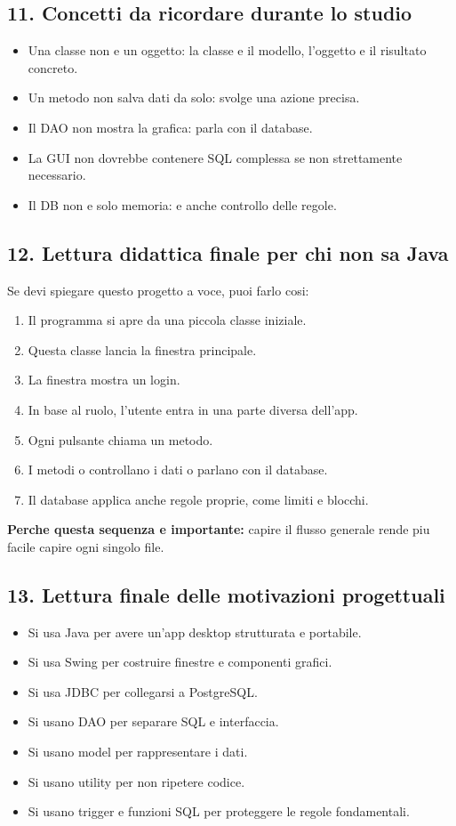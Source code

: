 \documentclass[12pt,a4paper]{article}
\begin{document}
\subsection{11. Concetti da ricordare durante lo studio}
\begin{itemize}
  \item Una classe non e un oggetto: la classe e il modello, l'oggetto e il risultato concreto.
  \item Un metodo non salva dati da solo: svolge una azione precisa.
  \item Il DAO non mostra la grafica: parla con il database.
  \item La GUI non dovrebbe contenere SQL complessa se non strettamente necessario.
  \item Il DB non e solo memoria: e anche controllo delle regole.
\end{itemize}

\subsection{12. Lettura didattica finale per chi non sa Java}
Se devi spiegare questo progetto a voce, puoi farlo cosi:
\begin{enumerate}
  \item Il programma si apre da una piccola classe iniziale.
  \item Questa classe lancia la finestra principale.
  \item La finestra mostra un login.
  \item In base al ruolo, l'utente entra in una parte diversa dell'app.
  \item Ogni pulsante chiama un metodo.
  \item I metodi o controllano i dati o parlano con il database.
  \item Il database applica anche regole proprie, come limiti e blocchi.
\end{enumerate}

\textbf{Perche questa sequenza e importante:} capire il flusso generale rende piu facile capire ogni singolo file.

\subsection{13. Lettura finale delle motivazioni progettuali}
\begin{itemize}
  \item Si usa Java per avere un'app desktop strutturata e portabile.
  \item Si usa Swing per costruire finestre e componenti grafici.
  \item Si usa JDBC per collegarsi a PostgreSQL.
  \item Si usano DAO per separare SQL e interfaccia.
  \item Si usano model per rappresentare i dati.
  \item Si usano utility per non ripetere codice.
  \item Si usano trigger e funzioni SQL per proteggere le regole fondamentali.
\end{itemize}
\end{document}
